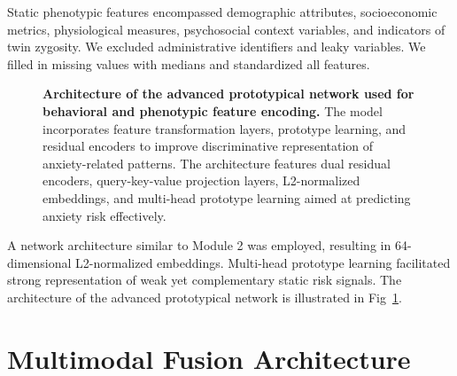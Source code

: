 \documentclass[10pt,letterpaper]{article}
\begin{document}
                                                                                                                  Static phenotypic features encompassed demographic attributes, socioeconomic metrics, physiological measures, psychosocial context variables, and indicators of twin zygosity. We excluded administrative identifiers and leaky variables. We filled in missing values with medians and standardized all features.

                                                                                                                  \begin{figure}[!ht]
                                                                                                                  \caption{\textbf{Architecture of the advanced prototypical network used for behavioral and phenotypic feature encoding.}
                                                                                                                   The model incorporates feature transformation layers, prototype learning, and residual encoders to improve discriminative representation of anxiety-related patterns. The architecture features dual residual encoders, query-key-value projection layers, L2-normalized embeddings, and multi-head prototype learning aimed at predicting anxiety risk effectively.}
                                                                                                                   \label{fig:proto_architecture}
                                                                                                                  \end{figure}

                                                                                                                  A network architecture similar to Module 2 was employed, resulting in 64-dimensional L2-normalized embeddings. Multi-head prototype learning facilitated strong representation of weak yet complementary static risk signals. The architecture of the advanced prototypical network is illustrated in Fig~\ref{fig:proto_architecture}.


                                                                                                                  \section*{Multimodal Fusion Architecture}
\end{document}
